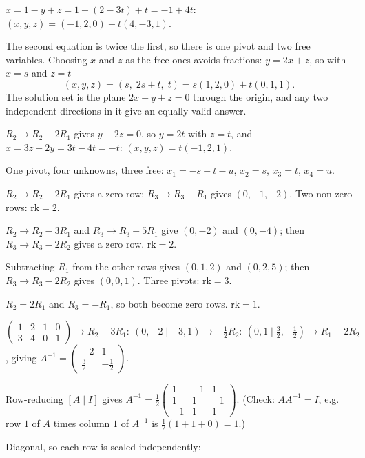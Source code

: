 \begin{solutions}
        $x=1-y+z=1-(2-3t)+t=-1+4t$:
        $(x,y,z)=(-1,2,0)+t(4,-3,1)$.
  \item The second equation is twice the first, so there is one pivot and
        two free variables. Choosing $x$ and $z$ as the free ones avoids
        fractions: $y=2x+z$, so with $x=s$ and $z=t$
        \[
          (x,y,z)=(s,\;2s+t,\;t)=s(1,2,0)+t(0,1,1).
        \]
        The solution set is the plane $2x-y+z=0$ through the origin, and
        any two independent directions in it give an equally valid
        answer.
  \item $R_{2}\to R_{2}-2R_{1}$ gives $y-2z=0$, so $y=2t$ with $z=t$, and
        $x=3z-2y=3t-4t=-t$: $(x,y,z)=t(-1,2,1)$.
  \item One pivot, four unknowns, three free:
        $x_{1}=-s-t-u$, $x_{2}=s$, $x_{3}=t$, $x_{4}=u$.
  \item $R_{2}\to R_{2}-2R_{1}$ gives a zero row;
        $R_{3}\to R_{3}-R_{1}$ gives $(0,-1,-2)$. Two non-zero rows:
        $\mathrm{rk}=2$.
  \item $R_{2}\to R_{2}-3R_{1}$ and $R_{3}\to R_{3}-5R_{1}$ give
        $(0,-2)$ and $(0,-4)$; then $R_{3}\to R_{3}-2R_{2}$ gives a zero
        row. $\mathrm{rk}=2$.
  \item Subtracting $R_{1}$ from the other rows gives $(0,1,2)$ and
        $(0,2,5)$; then $R_{3}\to R_{3}-2R_{2}$ gives $(0,0,1)$. Three
        pivots: $\mathrm{rk}=3$.
  \item $R_{2}=2R_{1}$ and $R_{3}=-R_{1}$, so both become zero rows.
        $\mathrm{rk}=1$.
  \item $\left(\begin{array}{cc|cc}1&2&1&0\\3&4&0&1\end{array}\right)
        \to R_{2}-3R_{1}:\ (0,-2\mid-3,1)
        \to -\tfrac12R_{2}:\ (0,1\mid\tfrac32,-\tfrac12)
        \to R_{1}-2R_{2}$, giving
        $A^{-1}=\begin{pmatrix}-2&1\\ \tfrac32&-\tfrac12\end{pmatrix}$.
  \item Row-reducing $[A\mid I]$ gives
        $A^{-1}=\tfrac12\begin{pmatrix}1&-1&1\\1&1&-1\\-1&1&1\end{pmatrix}$.
        (Check: $A A^{-1}=I$, e.g. row $1$ of $A$ times column $1$ of
        $A^{-1}$ is $\tfrac12(1+1+0)=1$.)
  \item Diagonal, so each row is scaled independently:

\end{solutions}
